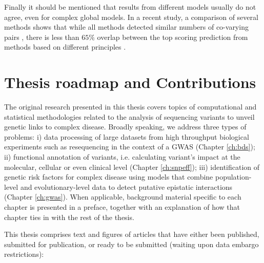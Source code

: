 Finally it should be mentioned that results from different models usually do not agree, even for complex global models.
In a recent study, a comparison of several methods shows that while all methods detected similar numbers of co-varying pairs
, there is less than $65\%$ overlap between the top scoring prediction from methods based on different principles \cite{clark2014multidimensional}.
\section{Thesis roadmap and Contributions}

The original research presented in this thesis covers topics of computational and statistical methodologies related to the analysis of sequencing variants to unveil genetic links to complex disease. 
Broadly speaking, we address three types of problems: 
i) data processing of large datasets from high throughput biological experiments such as resequencing in the context of a GWAS (Chapter \ref{ch:bds}); 
ii) functional annotation of variants, i.e. calculating variant's impact at the molecular, cellular or even clinical level (Chapter \ref{ch:snpeff}); 
iii) identification of genetic risk factors for complex disease using models that combine population-level and evolutionary-level data to detect putative epistatic interactions (Chapter \ref{ch:gwas}). 
When applicable, background material specific to each chapter is presented in a preface, together with an explanation of how that chapter ties in with the rest of the thesis.

This thesis comprises text and figures of articles that have either been published, submitted for publication, or ready to be submitted (waiting upon data embargo restrictions):
\\

